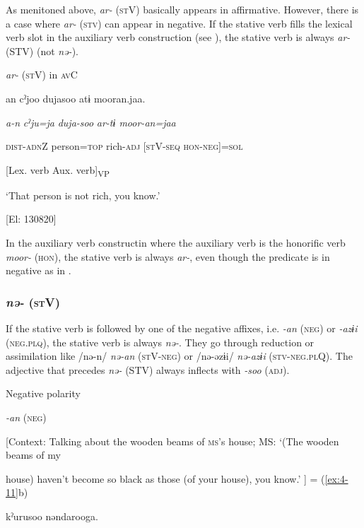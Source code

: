 As menitoned above, \textit{ar-} (\textsc{st}V) basically appears in affirmative. However, there is a case where \textit{ar-} (\textsc{stv}) can appear in negative. If the stative verb fills the lexical verb slot in the auxiliary verb construction (see ), the stative verb is always \textit{ar-} (STV) (not \textit{nə-}).

\ea\label{ex:8-48}
  \textit{ar-} (\textsc{st}V) in \textsc{av}C

  {\TM}
\glll  an  cˀjoo  dujasoo  atɨ  mooran.jaa.

    \textit{a-n}  \textit{cˀju=ja}  \textit{duja-soo}  \textit{ar{}-tɨ  moor-an=jaa}

    \textsc{dist}-\textsc{adn}Z  person=\textsc{top}  rich-\textsc{adj}  [\textsc{st}V-\textsc{seq}  \textsc{hon}-\textsc{neg}]=\textsc{sol}

          [Lex. verb  Aux. verb]\textsubscript{VP}

    ‘That person is not rich, you know.’

    [El: 130820]

In the auxiliary verb constructin where the auxiliary verb is the honorific verb \textit{moor-} (\textsc{hon}), the stative verb is always \textit{ar-}, even though the predicate is in negative as in .

\subsubsection{\textit{nə-} (\textsc{st}V)}

If the stative verb is followed by one of the negative affixes, i.e. \textit{{}-an} (\textsc{neg}) or \textit{{}-azɨi} (\textsc{neg}.\textsc{plq}), the stative verb is always \textit{nə-}. They go through reduction or assimilation like /nə-n/ \textit{nə-an} (\textsc{st}V-\textsc{neg}) or /nə-əzɨi/ \textit{nə-azɨi} (\textsc{stv}-\textsc{neg}.\textsc{pl}Q). The adjective that precedes \textit{nə-} (STV) always inflects with \textit{{}-soo} (\textsc{adj}).

\ea\label{ex:8-49}
  Negative polarity

\ea \textit{{}-an} (\textsc{neg})

    [Context: Talking about the wooden beams of \textsc{ms}’s house; MS: ‘(The wooden beams of my

house) haven’t become so black as those (of your house), you know.’ ] = (\ref{ex:4-11}b)

    {\TM}
\glll  kˀurusoo  nəndarooga.

